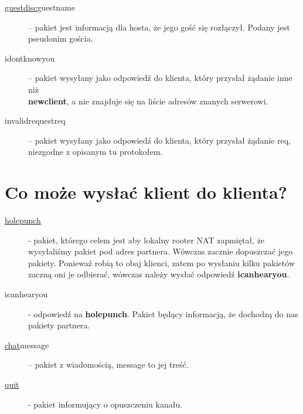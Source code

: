 \documentclass[a4paper, 10pt]{article}
\begin{document}
\begin{description}
 \item[ \underline{guestdisc}\textbar guestname] -- pakiet jest informacją dla hosta, że jego gość się rozłączył. Podany jest pseudonim gościa.
 \item[ idontknowyou\textbar] -- pakiet wysyłany jako odpowiedź do klienta, który przysłał żądanie inne niż\\ \textbf{newclient}, a nie znajduje się na liście adresów znanych serwerowi.
 \item[ invalidrequest\textbar req] -- pakiet wysyłany jako odpowiedź do klienta, który przysłał żądanie req, niezgodne z opisanym tu protokołem.
\end{description}

\section{Co może wysłać klient do klienta?}
\begin{description}
 \item[ \underline{holepunch}\textbar] - pakiet, którego celem jest aby lokalny rooter NAT zapmiętał, że wysyłaliśmy pakiet pod adres partnera. Wówczas zacznie dopuszczać jego pakiety. Poniewaź robią to obaj klienci, zatem po wysłaniu kilku pakietów zaczną oni je odbierać, wówczas należy wysłać odpowiedź \textbf{icanhearyou}. 
 \item[ icanhearyou\textbar] - odpowiedź na \textbf{holepunch}. Pakiet będący informacją, że dochodzą do nas pakiety partnera.
 \item[ \underline{chat}\textbar message] -- pakiet z wiadomością, {message} to jej treść.
 \item[ \underline{quit}\textbar] - pakiet informujący o opuszczeniu kanału.
\end{description}
\end{document}
